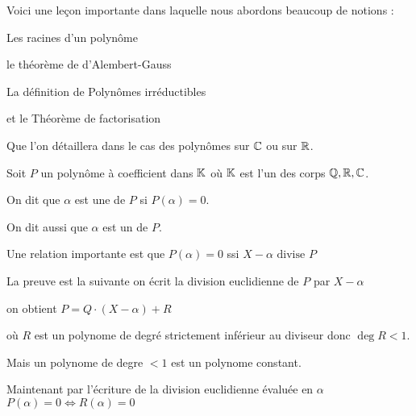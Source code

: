 






\debuttexte

\diapo

\change

Voici une leçon importante dans laquelle nous abordons beaucoup de notions : 

\change

Les racines d'un polynôme

\change

le théorème de d'Alembert-Gauss

\change

La définition de Polynômes irréductibles

\change

et le Théorème de factorisation

\change

Que l'on détaillera dans le cas des polynômes sur $\mathbb{C}$ ou sur $\mathbb{R}$.

\diapo

Soit $P$ un polynôme à coefficient dans $\mathbb{K}$ où $\mathbb{K}$ est l'un des corps $\mathbb{Q}, \mathbb{R}, \mathbb{C}$.

 On dit que
$\alpha$ est une   de $P$ si $P(\alpha)=0$.

On dit aussi que $\alpha$ est un  de $P$.


\change

Une relation importante est que 
$P(\alpha)=0$ ssi  $X-\alpha \text{ divise } P$

\change

La preuve est la suivante on écrit la division euclidienne de $P$ par $X-\alpha$ 

\change

on obtient  $P=Q\cdot(X-\alpha)+R$ 

\change

où $R$ est un polynome de degré strictement inférieur au diviseur donc $\deg R < 1$. 

\change

Mais un polynome de degre $<1$ est un polynome constant.


\change

Maintenant par l'écriture de la division euclidienne  évaluée en $\alpha$
$P(\alpha)=0 \iff R(\alpha) =0 $

